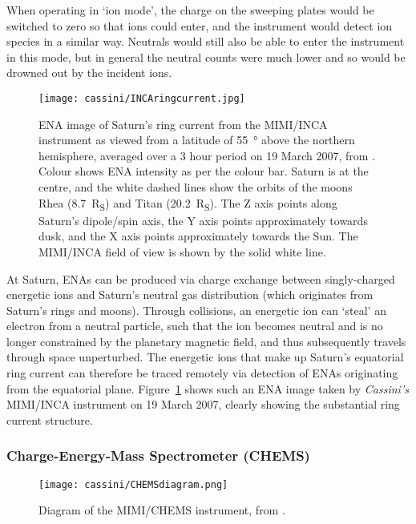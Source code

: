 When operating in `ion mode', the  charge on the sweeping plates would be switched to zero so that ions could enter, and the instrument would detect ion species in a similar way. Neutrals would still also be able to enter the instrument in this mode, but in general the neutral counts were much lower and so would be drowned out by the incident ions.

\begin{figure}
\centering
\noindent\texttt{[image: cassini/INCAringcurrent.jpg]}
\caption[ENA image of Saturn's ring current from MIMI/INCA.]{ENA image of Saturn's ring current from the MIMI/INCA instrument as viewed from a latitude of \SI{55}{\degree} above the northern hemisphere, averaged over a 3 hour period on 19 March 2007, from \citet{nasa2007}. Colour shows ENA intensity as per the colour bar. Saturn is at the  centre, and the white dashed lines show the orbits of the moons Rhea (\SI{8.7}{R_S}) and Titan (\SI{20.2}{R_S}). The Z axis points along Saturn's dipole/spin axis, the Y axis points approximately towards dusk, and the X axis points approximately  towards the Sun. The MIMI/INCA field of view is shown by the solid white line.}
\label{cassini:fig:INCAringcurrent}
\end{figure}

At Saturn, ENAs can be produced via charge exchange between singly-charged energetic ions and Saturn's neutral gas distribution (which originates from Saturn's rings and moons). Through collisions, an energetic ion can `steal' an electron from a neutral particle, such that the ion becomes neutral and is no longer constrained by the planetary magnetic field, and thus subsequently travels through space unperturbed. The energetic ions that make up Saturn's equatorial ring current can therefore be traced remotely via detection of ENAs originating from the equatorial plane. Figure~\ref{cassini:fig:INCAringcurrent} shows such an ENA image taken by \textit{Cassini's} MIMI/INCA instrument  on 19 March 2007, clearly showing the substantial ring current structure. 

\subsubsection{Charge-Energy-Mass Spectrometer (CHEMS)}
\begin{figure}
\centering
\noindent\texttt{[image: cassini/CHEMSdiagram.png]}
\caption[Diagram of the MIMI/CHEMS instrument.]{Diagram of the MIMI/CHEMS instrument, from \citet{krimigis2004}.}
\label{cassini:fig:CHEMSdiagram}
\end{figure}

